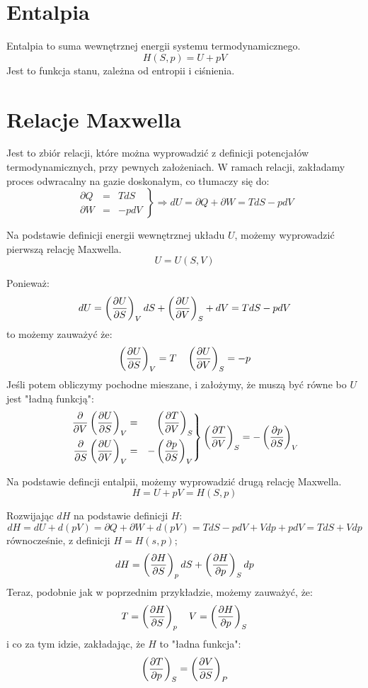 \documentclass{../notatki}
\begin{document}
\section{Entalpia}

Entalpia to suma wewnętrznej energii systemu termodynamicznego.
$$
H(S, p) = U + pV
$$
Jest to funkcja stanu, zależna od entropii i ciśnienia.

\section{Relacje Maxwella}

Jest to zbiór relacji, które można wyprowadzić z definicji
potencjałów termodynamicznych, przy pewnych założeniach. W ramach
relacji, zakładamy proces odwracalny na gazie doskonałym, co tłumaczy się do:
$$
\left.
\begin{aligned}
  \partial Q &=& TdS\\
  \partial W &=& -pdV
\end{aligned}
\right\rbrace \Rightarrow dU = \partial Q + \partial W = TdS - pdV
$$

\begin{examplebox}
  Na podstawie definicji energii wewnętrznej układu $U$, możemy wyprowadzić
  pierwszą relację Maxwella.
  $$
  U = U(S, V)
  $$

  \vspace{1em}
  Ponieważ:
  $$
  dU = \left(\frac{\partial U}{\partial S}\right)_V dS + \left(\frac{\partial U}{\partial V}\right)_S + dV = TdS - pdV
  $$
  to możemy zauważyć że:
  $$
  \left(\frac{\partial U}{\partial S}\right)_V = T \quad \left(\frac{\partial U}{\partial V}\right)_S = -p
  $$
  Jeśli potem obliczymy pochodne mieszane, i założymy, że muszą być
  równe bo $U$ jest "ładną funkcją":
  $$
  \left.
  \begin{aligned}
    \frac{\partial}{\partial V} \left(\frac{\partial U}{\partial S}\right)_V &=& \left(\frac{\partial T}{\partial V}\right)_S\\
    \frac{\partial}{\partial S} \left(\frac{\partial U}{\partial V}\right)_V &=& -\left(\frac{\partial p}{\partial S}\right)_V
  \end{aligned}
  \right\rbrace \left(\frac{\partial T}{\partial V}\right)_S = -\left(\frac{\partial p}{\partial S}\right)_V
  $$
\end{examplebox}

\begin{examplebox}
  Na podstawie defincji entalpii, możemy wyprowadzić drugą relację Maxwella.
  $$
  H = U + pV = H(S, p)
  $$

  \vspace{1em}
  Rozwijając $dH$ na podstawie definicji $H$:
  $$
  dH = dU + d(pV) = \partial Q + \partial W + d(pV)= TdS - pdV + Vdp +
  pdV = TdS + Vdp
  $$
  równocześnie, z definicji $H = H(s, p)$;
  $$
  dH = \left(\frac{\partial H}{\partial S}\right)_pdS + \left(\frac{\partial H}{\partial p}\right)_Sdp
  $$
  Teraz, podobnie jak w poprzednim przykładzie,
  możemy zauważyć, że:
  $$
  T = \left(\frac{\partial H}{\partial S}\right)_p \quad V = \left(\frac{\partial H}{\partial p}\right)_S
  $$
  i co za tym idzie, zakładając, że $H$ to "ładna funkcja":
  $$
  \left(\frac{\partial T}{\partial p}\right)_S = \left(\frac{\partial V}{\partial S}\right)_P
  $$
\end{examplebox}
\end{document}
